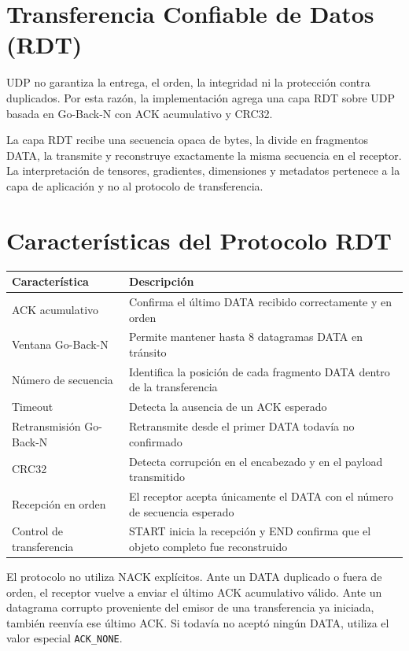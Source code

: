 \documentclass[12pt]{article}
\begin{document}
\section{Transferencia Confiable de Datos (RDT)}

UDP no garantiza la entrega, el orden, la integridad ni la protección contra
duplicados. Por esta razón, la implementación agrega una capa RDT sobre UDP
basada en Go-Back-N con ACK acumulativo y CRC32.

La capa RDT recibe una secuencia opaca de bytes, la divide en fragmentos DATA,
la transmite y reconstruye exactamente la misma secuencia en el receptor. La
interpretación de tensores, gradientes, dimensiones y metadatos pertenece a la
capa de aplicación y no al protocolo de transferencia.

\section{Características del Protocolo RDT}

\begin{table}[h]
\centering
\begin{tabular}{|l|p{9cm}|}
\hline
Característica & Descripción \\
\hline
ACK acumulativo & Confirma el último DATA recibido correctamente y en orden \\
\hline
Ventana Go-Back-N & Permite mantener hasta 8 datagramas DATA en tránsito \\
\hline
Número de secuencia & Identifica la posición de cada fragmento DATA dentro de la transferencia \\
\hline
Timeout & Detecta la ausencia de un ACK esperado \\
\hline
Retransmisión Go-Back-N & Retransmite desde el primer DATA todavía no confirmado \\
\hline
CRC32 & Detecta corrupción en el encabezado y en el payload transmitido \\
\hline
Recepción en orden & El receptor acepta únicamente el DATA con el número de secuencia esperado \\
\hline
Control de transferencia & START inicia la recepción y END confirma que el objeto completo fue reconstruido \\
\hline
\end{tabular}
\end{table}

El protocolo no utiliza NACK explícitos. Ante un DATA duplicado o fuera de
orden, el receptor vuelve a enviar el último ACK acumulativo válido. Ante un
datagrama corrupto proveniente del emisor de una transferencia ya iniciada,
también reenvía ese último ACK. Si todavía no aceptó ningún DATA, utiliza el
valor especial \texttt{ACK\_NONE}.
\end{document}
